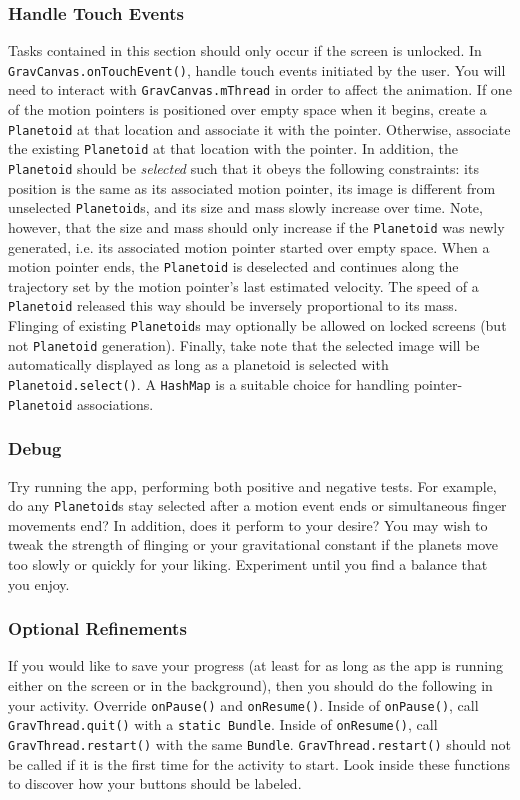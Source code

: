 \subsubsection{Handle Touch Events}
Tasks contained in this section should only occur if the screen is unlocked.
In \verb=GravCanvas.onTouchEvent()=, handle touch events initiated by the user.
You will need to interact with \verb=GravCanvas.mThread= in order to affect the animation.
If one of the motion pointers is positioned over empty space when it begins, create a \verb=Planetoid= at that location and associate it with the pointer.
Otherwise, associate the existing \verb=Planetoid= at that location with the pointer.
In addition, the \verb=Planetoid= should be {\em selected} such that it obeys the following constraints: its position is the same as its associated motion pointer, its image is different from unselected \verb=Planetoid=s, and its size and mass slowly increase over time.
Note, however, that the size and mass should only increase if the \verb=Planetoid= was newly generated, i.e. its associated motion pointer started over empty space.
When a motion pointer ends, the \verb=Planetoid= is deselected and continues along the trajectory set by the motion pointer's last estimated velocity. 
The speed of a \verb=Planetoid= released this way should be inversely proportional to its mass.
Flinging of existing \verb=Planetoid=s  may optionally be allowed on locked screens (but not \verb=Planetoid= generation).
Finally, take note that the selected image will be automatically displayed as long as a planetoid is selected with \verb=Planetoid.select()=.
A \verb=HashMap= is a suitable choice for handling pointer-\verb=Planetoid= associations.

\subsubsection{Debug}
Try running the app, performing both positive and negative tests.
For example, do any \verb=Planetoid=s stay selected after a motion event ends or simultaneous finger movements end?
In addition, does it perform to your desire?
You may wish to tweak the strength of flinging or your gravitational constant if the planets move too slowly or quickly for your liking.
Experiment until you find a balance that you enjoy.

\subsubsection{Optional Refinements}
If you would like to save your progress (at least for as long as the app is running either on the screen or in the background), then you should do the following in your activity.
Override \verb=onPause()= and \verb=onResume()=. 
Inside of \verb=onPause()=, call \verb=GravThread.quit()= with a \verb=static Bundle=. 
Inside of \verb=onResume()=, call \verb=GravThread.restart()= with the same \verb=Bundle=.
\verb=GravThread.restart()= should not be called if it is the first time for the activity to start.
Look inside these functions to discover how your buttons should be labeled.